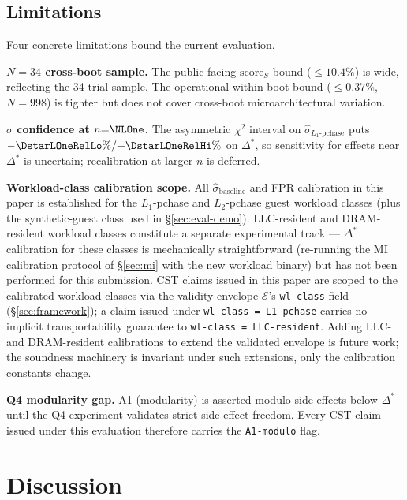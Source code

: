 \documentclass[conference]{IEEEtran}
\newcommand{\sigbase}{\hat{\sigma}_\text{baseline}}
\newcommand{\Dstar}{\Delta^{*}}
\newcommand{\scoreS}{\text{score}_S}
\begin{document}
\subsection{Limitations}\label{sec:eval-lim}

Four concrete limitations bound the current evaluation.

\textbf{$N{=}34$ cross-boot sample.} The public-facing $\scoreS$
bound ($\leq 10.4\%$) is wide, reflecting the 34-trial sample. The
operational within-boot bound ($\leq 0.37\%$, $N{=}998$) is tighter
but does not cover cross-boot microarchitectural variation.

\textbf{$\hat{\sigma}$ confidence at $n{=}\NLOne$.} The asymmetric
$\chi^2$ interval on $\hat{\sigma}_{L_1\text{-pchase}}$ puts
${-}\DstarLOneRelLo\%/{+}\DstarLOneRelHi\%$ on $\Dstar$, so sensitivity
for effects near $\Dstar$ is uncertain; recalibration at larger $n$
is deferred.

\textbf{Workload-class calibration scope.} All $\sigbase$ and FPR
calibration in this paper is established for the $L_1$-pchase and
$L_2$-pchase guest workload classes (plus the synthetic-guest
class used in \S\ref{sec:eval-demo}). LLC-resident and
DRAM-resident workload classes constitute a separate experimental
track --- $\Dstar$ calibration for these classes is mechanically
straightforward (re-running the MI calibration protocol of
\S\ref{sec:mi} with the new workload binary) but has not been
performed for this submission. CST claims issued in this paper
are scoped to the calibrated workload classes via the validity
envelope $\mathcal{E}$'s \texttt{wl-class} field
(\S\ref{sec:framework}); a claim issued under
\texttt{wl-class = L1-pchase} carries no implicit transportability
guarantee to \texttt{wl-class = LLC-resident}. Adding LLC- and
DRAM-resident calibrations to extend the validated envelope is
future work; the soundness machinery is invariant under such
extensions, only the calibration constants change.

\textbf{Q4 modularity gap.} A1 (modularity) is asserted modulo
side-effects below $\Dstar$ until the Q4 experiment validates strict
side-effect freedom. Every CST claim issued under this evaluation
therefore carries the \texttt{A1-modulo} flag.

\section{Discussion}\label{sec:discussion}
\end{document}
